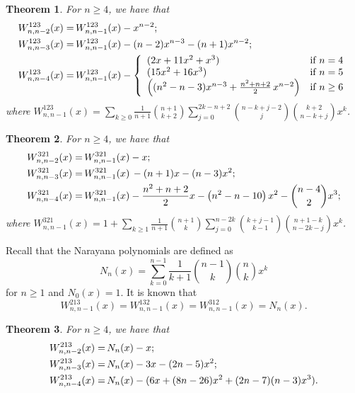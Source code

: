 \documentclass[11pt]{article}
\newtheorem{thm}{Theorem}
\newcommand{\+}{\mbox{\ensuremath{\scriptstyle{+}}}}
\begin{document}
\begin{thm}\label{123-thm} For $n\ge 4$, we have that
	\begin{align}
		W^{123}_{n,n-2}(x) = &
		\,   W^{123}_{n,n-1}(x)  - x^{n-2}; \notag                   \\
		W^{123}_{n,n-3}(x) = &
		\,   W^{123}_{n,n-1}(x)  - (n-2)x^{n-3}-(n+1)x^{n-2}; \notag \\
		W^{123}_{n,n-4}(x) = &
		\,   W^{123}_{n,n-1}(x)  - 	\left\{\begin{array}{ll}
			                                   (2x+11x^2+x^3)                                              & \mbox{if }n=4     \\
			                                   (15x^2+16x^3)                                               & \mbox{if }n=5     \\
			                                   \left((n^2-n-3)x^{n-3} + \frac{n^2+n+2}{2}\, x^{n-2}\right) & \mbox{if }n\geq 6\end{array}\right. \notag
	\end{align}
	where $W^{123}_{n,n-1}(x)=\displaystyle\sum_{k\geq 0}\frac{1}{n+1}{n+1\choose k+2}\sum_{j=0}^{2k-n+2}{n-k+j-2\choose {j}}{k+2 \choose n-k+j}x^k$.
\end{thm}

\begin{thm}\label{321-thm} For $n\ge 4$, we have that
	\begin{align}
		W^{321}_{n,n-2}(x) = &
		\,   W^{321}_{n,n-1}(x)  - x; \notag                    \\
		W^{321}_{n,n-3}(x) = &
		\,   W^{321}_{n,n-1}(x)  \,  - (n+1)x -(n-3)x^2; \notag \\
		W^{321}_{n,n-4}(x) = &
		\,   W^{321}_{n,n-1}(x)  - \frac{n^2+n+2}{2}x-\left(n^2-n-10\right)x^2-\binom{n-4}{2}x^3 ; \notag
	\end{align}
	where $W^{321}_{n,n-1}(x)={1+\displaystyle\sum_{k\geq1}}\frac{1}{n+1}{n+1\choose k}\sum_{j=0}^{n-2k}{k+j-1\choose k-1}{n+1-k \choose n-2k-j}x^k$.
\end{thm}
Recall that the Narayana polynomials are defined as  $$N_{n}(x) = \displaystyle\sum_{k= 0}^{n-1}\frac{1}{k+1}{n-1\choose k}{n\choose k}x^k$$ for $n\ge 1$ and $N_{0}(x)=1$. It is known that
$$W^{213}_{n,n-1}(x)=W^{132}_{n,n-1}(x)= W^{312}_{n,n-1}(x)= N_n(x).$$
\begin{thm}\label{213-thm} For $n\ge 4$, we have that
	\begin{align}
		W^{213}_{n,n-2}(x) = &
		\,   N_{n}(x)  - x; \notag            \\
		W^{213}_{n,n-3}(x) = &
		\,   N_{n}(x)  - 3x-(2n-5)x^2; \notag \\
		W^{213}_{n,n-4}(x) = &
		\,   N_{n}(x)  - 	(6x+(8n-26)x^2+(2n-7)(n-3)x^3).  \notag
	\end{align}
\end{thm}
\end{document}
